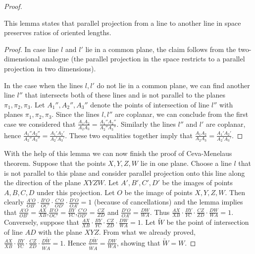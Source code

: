 \begin{proof}
\begin{lemma}
\end{lemma}
This lemma states that parallel projection from a line to another line in space preserves ratios of oriented lengths.
\begin{proof}
In case line $l$ and $l'$ lie in a common plane, the claim follows from the two-dimensional analogue (the parallel projection in the space restricts to a parallel projection in two dimensions).

In the case when the lines $l,l'$ do not lie in a common plane, we can find another line $l''$ that intersects both of these lines and is not parallel to the planes $\pi_1,\pi_2,\pi_3$. Let $A_1'',A_2'',A_3''$ denote the points of intersection of line $l''$ with planes $\pi_1,\pi_2,\pi_3$. Since the lines $l,l''$ are coplanar, we can conclude from the first case we considered that $\frac{A_1A_2}{A_2A_3}=\frac{A_1''A_2''}{A_2''A_3''}$. Similarly the lines $l''$ and $l'$ are coplanar, hence $\frac{A_1''A_2''}{A_2''A_3''}=\frac{A_1'A_2'}{A_2'A_3'}$. These two equalities together imply that $\frac{A_1A_2}{A_2A_3}=\frac{A_1'A_2'}{A_2'A_3'}$.

\end{proof}
With the help of this lemma we can now finish the proof of Ceva-Menelaus theorem. Suppose that the points $X,Y,Z,W$ lie in one plane. Choose a line $l$ that is not parallel to this plane and consider parallel projection onto this line along the direction of the plane $XYZW$. Let $A',B',C',D'$ be the images of points $A,B,C,D$ under this projection. Let $O$ be the image of points $X,Y,Z,W$. Then clearly $\frac{A'O}{OB'}\cdot\frac{B'O}{OC'}\cdot\frac{C'O}{OD'}\cdot\frac{D'O}{OA'}=1$ (because of cancellations) and the lemma implies that $\frac{A'O}{OB'}=\frac{AX}{XB}$,$\frac{B'O}{OC'}=\frac{BY}{YC}$,$\frac{C'O}{OD'}=\frac{CZ}{ZD}$ and $\frac{D'O}{OA'}=\frac{DW}{WA}$. Thus $\frac{AX}{XB}\cdot\frac{BY}{YC}\cdot\frac{CZ}{ZD}\cdot\frac{DW}{WA}=1$.
Conversely, suppose that $\frac{AX}{XB}\cdot\frac{BY}{YC}\cdot\frac{CZ}{ZD}\cdot\frac{DW}{WA}=1$. Let $\tilde{W}$ be the point of intersection of line $AD$ with the plane $XYZ$. From what we already proved, $\frac{AX}{XB}\cdot\frac{BY}{YC}\cdot\frac{CZ}{ZD}\cdot\frac{D\tilde{W}}{\tilde{W}A}=1$. Hence $\frac{D\tilde{W}}{\tilde{W}A}=\frac{DW}{WA}$, showing that $\tilde{W}=W$.
\end{proof}
